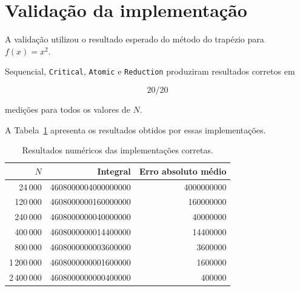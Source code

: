 \section{Validação da implementação}

\label{sec:atvd06-validacao}

A validação utilizou o resultado esperado do método do trapézio para
\(f(x)=x^2\).

Sequencial, \texttt{Critical}, \texttt{Atomic} e \texttt{Reduction}
produziram resultados corretos em

\begin{equation}
    20/20
\end{equation}

medições para todos os valores de \(N\).

A Tabela~\ref{tab:atvd06-resultados-corretos} apresenta os resultados
obtidos por essas implementações.

\begin{table}[htbp]
    \centering
    \caption{Resultados numéricos das implementações corretas.}
    \label{tab:atvd06-resultados-corretos}
    \small

    \begin{tabular}{r|r|r}
        \hline
        \(N\) & Integral & Erro absoluto médio \\
        \hline

        24\,000 &
        4608000004000000000 &
        4000000000 \\

        120\,000 &
        4608000000160000000 &
        160000000 \\

        240\,000 &
        4608000000040000000 &
        40000000 \\

        400\,000 &
        4608000000014400000 &
        14400000 \\

        800\,000 &
        4608000000003600000 &
        3600000 \\

        1\,200\,000 &
        4608000000001600000 &
        1600000 \\

        2\,400\,000 &
        4608000000000400000 &
        400000 \\
        \hline
    \end{tabular}
\end{table}

